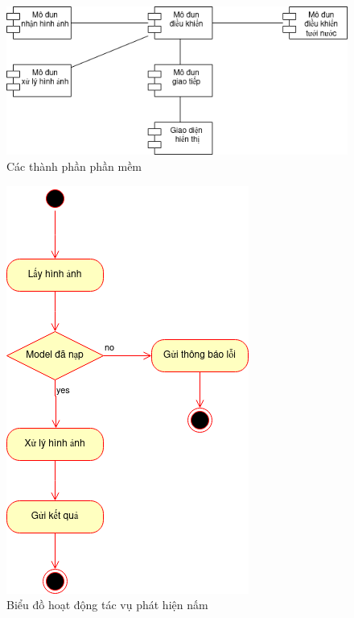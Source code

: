 \begin{figure}
    \centering
    \includegraphics[width=0.75\linewidth]{images/software-component.png}
    \caption{Các thành phần phần mềm}
    \label{fig:software-component}
\end{figure}

\begin{figure}
    \centering
    \includegraphics[width=0.55\linewidth]{images/vision-actvity.png}
    \caption{Biểu đồ hoạt động tác vụ phát hiện nấm}
    \label{fig:vision-activity}
\end{figure}


